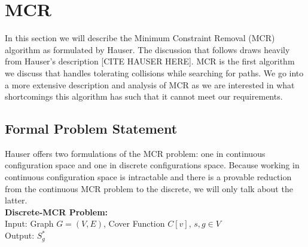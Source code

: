{}

\section{MCR}
In this section we will describe the Minimum Constraint Removal (MCR) algorithm as formulated by Hauser. The discussion that follows draws heavily from Hauser's description [CITE HAUSER HERE]. MCR is the first algorithm we discuss that handles tolerating collisions while searching for paths. We go into a more extensive description and analysis of MCR as we are interested in what shortcomings this algorithm has such that it cannot meet our requirements.

\subsection{Formal Problem Statement}
Hauser offers two formulations of the MCR problem: one in continuous configuration space and one in discrete configurations space. Because working in continuous configuration space is intractable and there is a provable reduction from the continuous MCR problem to the discrete, we will only talk about the latter. \\

\noindent 
{\bf{Discrete-MCR Problem:}}\\
Input: Graph $G = (V,E)$, Cover Function $C[v]$, $s,g \in V$  \\
Output: $S^{*}_g$
\newline

